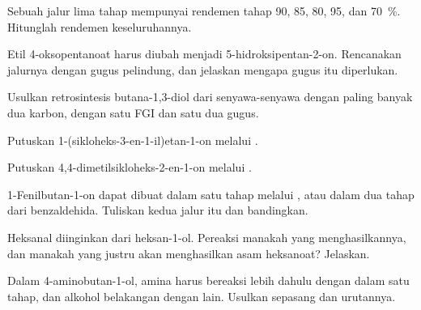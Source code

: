 \begin{exercise}[$\star$]\label{exo:b2:retrosynthesis:3}
Sebuah jalur lima tahap mempunyai rendemen tahap 90, 85, 80, 95, dan 70~\%. Hitunglah rendemen keseluruhannya.
\end{exercise}

\begin{exercise}[$\star$]\label{exo:b2:retrosynthesis:4}
Etil 4-oksopentanoat harus diubah menjadi 5-hidroksipentan-2-on.
Rencanakan jalurnya dengan gugus pelindung, dan jelaskan mengapa gugus itu
diperlukan.
\end{exercise}

\begin{exercise}[$\star\star$]\label{exo:b2:retrosynthesis:5}
Usulkan retrosintesis butana-1,3-diol dari senyawa-senyawa dengan paling
banyak dua karbon, dengan satu FGI dan satu  dua gugus.
\end{exercise}

\begin{exercise}[$\star\star$]\label{exo:b2:retrosynthesis:6}
Putuskan 1-(sikloheks-3-en-1-il)etan-1-on melalui .
\end{exercise}

\begin{exercise}[$\star\star$]\label{exo:b2:retrosynthesis:7}
Putuskan 4,4-dimetilsikloheks-2-en-1-on melalui .
\end{exercise}

\begin{exercise}[$\star\star$]\label{exo:b2:retrosynthesis:8}
1-Fenilbutan-1-on dapat dibuat dalam satu tahap melalui , atau dalam dua tahap dari benzaldehida. Tuliskan kedua
jalur itu dan bandingkan.
\end{exercise}

\begin{exercise}[$\star\star$]\label{exo:b2:retrosynthesis:9}
Heksanal diinginkan dari heksan-1-ol. Pereaksi manakah yang
menghasilkannya, dan manakah yang justru akan menghasilkan asam heksanoat?
Jelaskan.
\end{exercise}

\begin{exercise}[$\star\star\star$]\label{exo:b2:retrosynthesis:10}
Dalam 4-aminobutan-1-ol, amina harus bereaksi lebih dahulu dengan  dalam satu tahap, dan alkohol belakangan dengan  lain.
Usulkan sepasang  dan urutannya.
\end{exercise}

